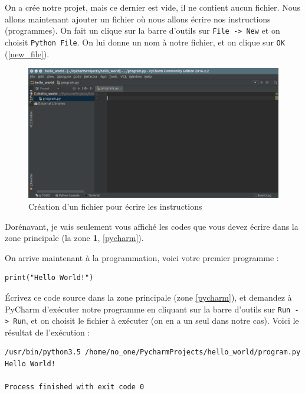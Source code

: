 \documentclass[12pt]{article}
\newcommand{\code}[1]{\colorbox{light-gray}{\texttt{#1}}}
\begin{document}
        On a crée notre projet, mais ce dernier est vide, il ne contient aucun fichier. Nous allons maintenant ajouter
        un fichier où nous allons écrire nos instructions (programmes). On fait un clique sur la barre d'outils sur
        \code{File -> New} et on choisit \code{Python File}. On lui donne un nom à notre fichier, et on clique sur
        \code{OK} (\autoref{new_file}).

        \begin{figure}[H]
            \centering
            \includegraphics[width=\linewidth]{img/10_new_file.png}
            \caption{Création d'un fichier pour écrire les instructions}
            \label{new_file}
        \end{figure}

        Dorénavant, je vais seulement vous affiché les codes que vous devez écrire dans la zone principale (la zone
        \textbf{1}, \autoref{pycharm}).

        On arrive maintenant à la programmation, voici votre premier programme :
        \begin{lstlisting}[style=code]
print("Hello World!")
        \end{lstlisting}

        Écrivez ce code source dans la zone principale (zone  \autoref{pycharm}), et demandez à PyCharm
        d'exécuter notre programme en cliquant sur la barre d'outils sur \code{Run -> Run}, et on choisit le fichier
        à exécuter (on en a un seul dans notre cas). Voici le résultat de l'exécution :

        \begin{lstlisting}[style=exec_result]
/usr/bin/python3.5 /home/no_one/PycharmProjects/hello_world/program.py
Hello World!

Process finished with exit code 0
        \end{lstlisting}
\end{document}
